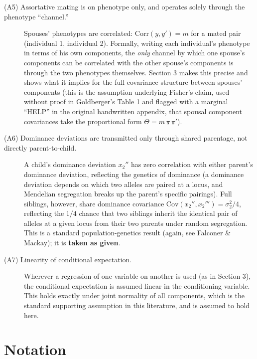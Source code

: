 \documentclass[12pt]{article}
\begin{document}
\begin{description}
\item[(A5) Assortative mating is on phenotype only, and operates solely through the phenotype ``channel.''] Spouses' phenotypes are correlated: $\mathrm{Corr}(y,y')=m$ for a mated pair (individual 1, individual 2). Formally, writing each individual's phenotype in terms of his own components, the \emph{only} channel by which one spouse's components can be correlated with the other spouse's components is through the two phenotypes themselves. Section 3 makes this precise and shows what it implies for the full covariance structure between spouses' components (this is the assumption underlying Fisher's claim, used without proof in Goldberger's Table 1 and flagged with a marginal ``HELP'' in the original handwritten appendix, that spousal component covariances take the proportional form $\Theta = m\,\underline\pi\,\underline\pi'$).

\item[(A6) Dominance deviations are transmitted only through shared parentage, not directly parent-to-child.] A child's dominance deviation $x_2''$ has zero correlation with either parent's dominance deviation, reflecting the genetics of dominance (a dominance deviation depends on which two alleles are paired at a locus, and Mendelian segregation breaks up the parent's specific pairings). Full siblings, however, share dominance covariance $\mathrm{Cov}(x_2'',x_2''')=\sigma_2^2/4$, reflecting the $1/4$ chance that two siblings inherit the identical pair of alleles at a given locus from their two parents under random segregation. This is a standard population-genetics result (again, see Falconer \& Mackay); it is \textbf{taken as given}.

\item[(A7) Linearity of conditional expectation.] Wherever a regression of one variable on another is used (as in Section 3), the conditional expectation is assumed linear in the conditioning variable. This holds exactly under joint normality of all components, which is the standard supporting assumption in this literature, and is assumed to hold here.
\end{description}

\section{Notation}
\end{document}
